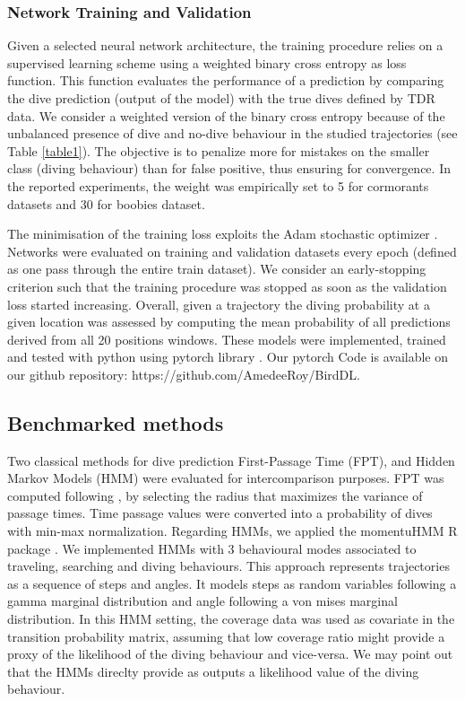 \documentclass{article}
\begin{document}
\subsubsection{Network Training and Validation}
Given a selected neural network architecture, the training procedure relies on a supervised learning scheme using a weighted binary cross entropy as loss function.
This function evaluates the performance of a prediction by comparing the dive prediction (output of the model) with the true dives defined by TDR data. We consider a weighted version of the binary cross entropy because of the unbalanced presence of dive and no-dive behaviour in the studied trajectories (see Table \ref{table1}). The objective is to penalize more  for mistakes on the smaller class (diving behaviour) than for false positive, thus ensuring for convergence. In the reported experiments, the weight was empirically set to 5 for cormorants datasets and 30 for boobies dataset.

The minimisation of the training loss exploits the  Adam stochastic optimizer \cite{kingma_adam_2014}.
Networks were evaluated on training and validation datasets every epoch (defined as one pass through the entire train dataset). We consider an early-stopping criterion such that the training procedure was stopped as soon as the validation loss started increasing.
Overall, given a trajectory the diving probability at a given location was assessed by computing the mean probability of all predictions derived from all 20 positions windows.
These models were implemented, trained and tested with python using pytorch library \cite{paskze_pytorch_2019}. Our pytorch Code is available on our github repository: https://github.com/AmedeeRoy/BirdDL.

\subsection{Benchmarked methods}
Two classical methods for dive prediction First-Passage Time (FPT), and Hidden Markov Models (HMM) were evaluated for intercomparison purposes.
FPT was computed following \cite{fauchald_using_2003}, by selecting the radius that maximizes the variance of passage times. Time passage values were converted into a probability of dives with min-max normalization.
Regarding HMMs, we applied the momentuHMM R package \cite{mcclintock_momentuhmm_2018}. We implemented HMMs with 3 behavioural modes associated to traveling, searching and diving behaviours. This approach represents trajectories as a sequence of steps and angles. It models steps as random variables following a gamma marginal distribution and angle following a von mises marginal distribution.
In this HMM setting, the coverage data was used as covariate in the transition probability matrix, assuming that low coverage ratio might provide a proxy of the likelihood of the diving behaviour and vice-versa. We may point out that the HMMs direclty provide as outputs a likelihood value of the diving behaviour.
\end{document}
